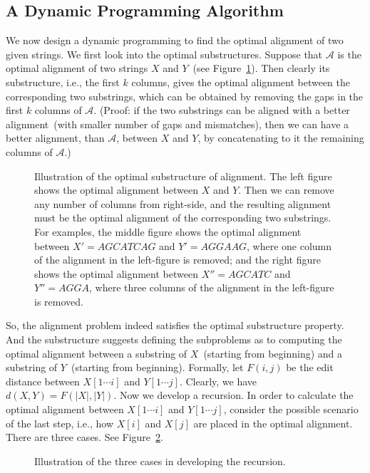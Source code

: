 \subsection*{A Dynamic Programming Algorithm}

We now design a dynamic programming to find the optimal alignment of two given strings.
We first look into the optimal substructures. Suppose that $\mathcal{A}$ is the optimal
alignment of two strings $X$ and $Y$~(see Figure~\ref{fig:optimal}).
Then clearly its substructure, i.e., the first $k$ columns, gives the optimal
alignment between the corresponding two substrings, which can be obtained by removing
the gaps in the first $k$ columns of $\mathcal{A}$.
(Proof: if the two substrings can be aligned with
a better alignment~(with smaller number of gaps and mismatches), then we can have
a better alignment, than $\mathcal{A}$, between $X$ and $Y$,
by concatenating to it the remaining columns of $\mathcal{A}$.)

\begin{figure}[h]
\centering{}
\caption{Illustration of the optimal substructure of alignment.
The left figure shows the optimal alignment between $X$ and $Y$.
Then we can remove any number of columns from right-side, and the resulting
alignment must be the optimal alignment of the corresponding two substrings.
For examples, the middle figure shows the optimal alignment between $X' = AGCATCAG$ and $Y' = AGGAAG$,
where one column of the alignment in the left-figure is removed;
and the right figure shows the optimal alignment between $X'' = AGCATC$ and $Y'' = AGGA$,
where three columns of the alignment in the left-figure is removed.}
\label{fig:optimal}
\end{figure}

So, the alignment problem indeed satisfies the optimal substructure property.
And the substructure suggests defining the subproblems as to computing the optimal
alignment between a substring of $X$~(starting from beginning) and 
a substring of $Y$~(starting from beginning).
Formally, let $F(i,j)$ be the edit distance between $X[1\cdots i]$ and $Y[1\cdots j]$.
Clearly, we have $d(X, Y) = F(|X|, |Y|)$.
Now we develop a recursion. In order to calculate the optimal alignment between $X[1\cdots i]$
and $Y[1\cdots j]$, consider the possible scenario of the last step, i.e., how $X[i]$ and $X[j]$
are placed in the optimal alignment. There are three cases. See Figure~\ref{fig:recursion}.

\begin{figure}[h]
\centering{}
\caption{Illustration of the three cases in developing the recursion.}
\label{fig:recursion}
\end{figure}



